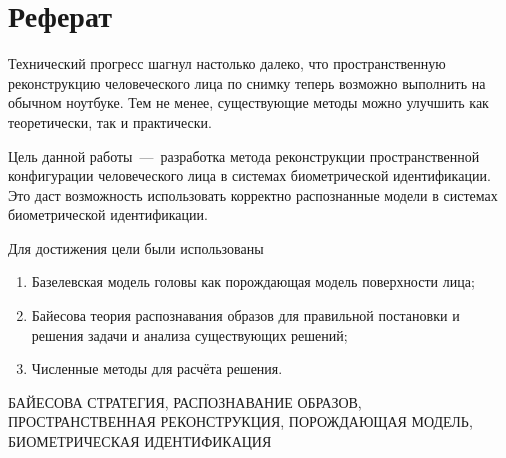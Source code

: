 \chapter*{Реферат}

Технический прогресс шагнул настолько далеко,
что пространственную реконструкцию человеческого лица по снимку
теперь возможно выполнить на обычном ноутбуке.
Тем не менее,
существующие методы можно улучшить как теоретически, так и практически.

Цель данной работы~---~разработка метода
реконструкции пространственной конфигурации человеческого лица
в системах биометрической идентификации.
Это даст возможность использовать корректно распознанные модели
в системах биометрической идентификации.

Для достижения цели были использованы
\begin{enumerate}
  \item
    Базелевская модель головы
    как порождающая модель поверхности лица;
  \item
    Байесова теория распознавания образов
    для правильной постановки и решения задачи и анализа существующих решений;
  \item
    Численные методы для расчёта решения.
\end{enumerate}

\MakeUppercase{байесова стратегия, распознавание образов,
пространственная реконструкция, порождающая модель,
биометрическая идентификация}
